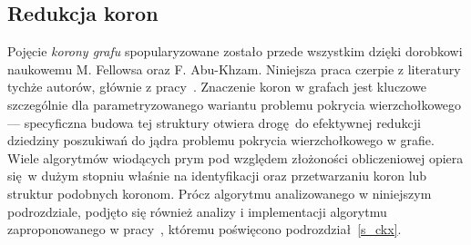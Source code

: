 \subsection{Redukcja koron}
\label{ss_kernelization_crown_reduction}
\par{
  Pojęcie \emph{korony grafu} spopularyzowane zostało przede wszystkim dzięki dorobkowi naukowemu M. Fellowsa oraz F. Abu-Khzam.
  Niniejsza praca czerpie z literatury tychże autorów, głównie z pracy~\cite{KernelizationAlgorithms04}.
  Znaczenie koron w grafach jest kluczowe szczególnie dla parametryzowanego wariantu problemu pokrycia wierzchołkowego --- specyficzna budowa tej struktury otwiera drogę do efektywnej redukcji dziedziny poszukiwań do jądra problemu pokrycia wierzchołkowego w grafie.
  Wiele algorytmów wiodących prym pod względem złożoności obliczeniowej opiera się w dużym stopniu właśnie na identyfikacji oraz przetwarzaniu koron lub struktur podobnych koronom.
  Prócz algorytmu analizowanego w niniejszym podrozdziale, podjęto się również analizy i implementacji algorytmu zaproponowanego w pracy~\cite{ImprovedBounds10}, któremu poświęcono podrozdział~\ref{s_ckx}.
}
